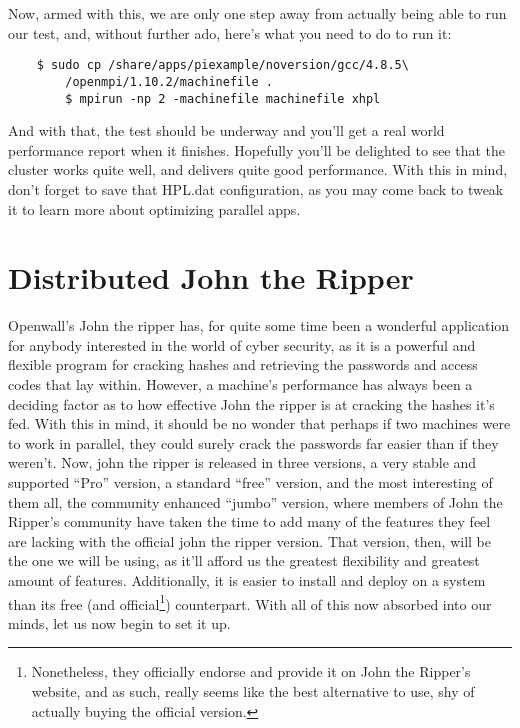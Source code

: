 \documentclass[]{article}
\begin{document}
    Now, armed with this, we are only one step away from actually being able to run our test, and, without 
    further ado, here's what you need to do to run it:
    \begin{lstlisting}
    $ sudo cp /share/apps/piexample/noversion/gcc/4.8.5\
        /openmpi/1.10.2/machinefile .
        $ mpirun -np 2 -machinefile machinefile xhpl
        \end{lstlisting}
        And with that, the test should be underway and you'll get a real world performance report when it finishes.
        Hopefully you'll be delighted to see that the cluster works quite well, and delivers quite good performance. With this in mind, don't 
        forget to save that HPL.dat configuration, as you may come back to tweak it to learn more about optimizing parallel apps.

        \section{Distributed John the Ripper}
        Openwall's John the ripper has, for quite some time been a wonderful application for anybody interested in the world of cyber security, 
        as it is a powerful and flexible program for cracking hashes and retrieving the passwords and access codes that lay within. However, a 
        machine's performance has always been a deciding factor as to how effective John the ripper is at cracking the hashes it's fed. With 
        this in mind, it should be no wonder that perhaps if two machines were to work in parallel, they could surely crack the passwords far 
        easier than if they weren't. Now, john the ripper is released in three versions, a very stable and supported ``Pro'' version, a 
        standard ``free'' version, and the most interesting of them all, the community enhanced ``jumbo'' version, where members of John the 
        Ripper's community have taken the time to add many of the features they feel are lacking with the official john the ripper version. 
        That version, then, will be the one we will be using, as it'll afford us the greatest flexibility and greatest amount of features. 
        Additionally, it is easier to install and deploy on a system than its free (and official\footnote{Nonetheless, they officially endorse 
                and provide it on John the Ripper's website, and as such, really seems like the best alternative to use, shy of actually buying the 
                official version.}) counterpart. With all of this now absorbed into our minds, let us now begin to set it up.
\end{document}
